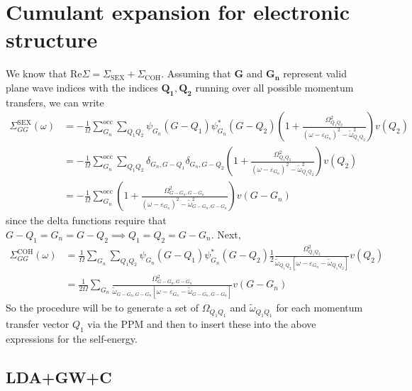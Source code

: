 \section{Cumulant expansion for electronic structure}
We know that $\mathrm{Re} \Sigma=\Sigma_{\mathrm{SEX}}+\Sigma_{\mathrm{COH}}$. Assuming that $\bm{G}$ and $\bm{G_n}$ represent valid plane wave indices with the indices $\bm{Q_1},\bm{Q_2}$ running over all possible momentum transfers, we can write
\begin{align}
\Sigma_{G G}^{\mathrm{SEX}}(\omega ) & =-\frac{1}{\Omega} \sum_{G_n}^{\mathrm{occ}} \sum_{Q_1 Q_2} \psi_{G_n} (G-Q_1) \psi_{G_n}^* (G-Q_2) \left(1+\frac{\Omega_{Q_1 Q_2}^2}{\left(\omega-\varepsilon_{G_n}\right)^2-\tilde{\omega}_{Q_1 Q_2}^2}\right) v\left(Q_2\right) \\
&= -\frac{1}{\Omega} \sum_{G_n}^{\mathrm{occ}} \sum_{Q_1Q_2} \delta_{G_n, G-Q_1} \delta_{G_n, G-Q_2} \left(1+\frac{\Omega_{Q_1 Q_2}^2}{\left(\omega-\varepsilon_{G_n}\right)^2-\tilde{\omega}_{Q_1 Q_2}^2}\right) v\left(Q_2\right) \\
&= -\frac{1}{\Omega} \sum_{G_n}^{\mathrm{occ}} \left(1+\frac{\Omega_{G-G_n, G-G_n}^2}{\left(\omega-\varepsilon_{G_n}\right)^2-\tilde{\omega}_{G-G_n, G-G_n}^2}\right) v\left(G-G_n\right)
\end{align}
since the delta functions require that $G-Q_1=G_n=G-Q_2\implies Q_1=Q_2=G-G_n$. Next,
\begin{align}
\Sigma_{G G}^{\mathrm{COH}}(\omega ) & =\frac{1}{\Omega} \sum_{G_n} \sum_{Q_1 Q_2} \psi_{G_n} (G-Q_1) \psi_{G_n}^* (G-Q_2) \frac{1}{2} \frac{\Omega_{Q_1 Q_2}^2}{\tilde{\omega}_{Q_1 Q_2}\left[\omega-\varepsilon_{G_n}-\tilde{\omega}_{Q_1 Q_2}\right]} v\left(Q_2\right) \\
&= \frac{1}{2\Omega} \sum_{G_n}  \frac{\Omega_{G-G_n, G-G_n}^2}{\tilde{\omega}_{G-G_n, G-G_n}\left[\omega-\varepsilon_{G_n}-\tilde{\omega}_{G-G_n, G-G_n}\right]} v\left(G-G_n\right)
\end{align}
So the procedure will be to generate a set of $\Omega_{Q_1 Q_1}$ and $\tilde{\omega}_{Q_1 Q_1}$ for each momentum transfer vector $Q_1$ via the PPM and then to insert these into the above expressions for the self-energy.
\subsection{LDA+GW+C}
